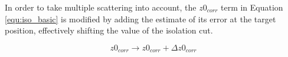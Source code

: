
In order to take multiple scattering into account, the $z0_{corr}$ term in Equation \ref{equ:iso_basic} is modified by adding the estimate of its error at the target position, effectively shifting the value of the isolation cut.

\begin{equation}
    z0_{corr} \longrightarrow z0_{corr} + \Delta z0_{corr}
\end{equation}


